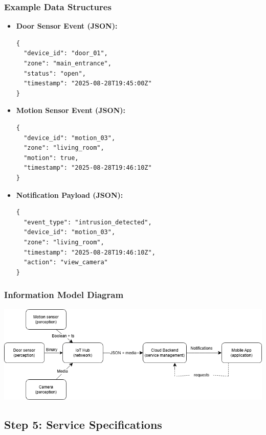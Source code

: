 \documentclass[conference]{IEEEtran}
\begin{document}
\subsubsection{Example Data Structures}
\begin{itemize}
    \item \textbf{Door Sensor Event (JSON):}
\begin{verbatim}
{
  "device_id": "door_01",
  "zone": "main_entrance",
  "status": "open",
  "timestamp": "2025-08-28T19:45:00Z"
}
\end{verbatim}

    \item \textbf{Motion Sensor Event (JSON):}
\begin{verbatim}
{
  "device_id": "motion_03",
  "zone": "living_room",
  "motion": true,
  "timestamp": "2025-08-28T19:46:10Z"
}
\end{verbatim}

    \item \textbf{Notification Payload (JSON):}
\begin{verbatim}
{
  "event_type": "intrusion_detected",
  "device_id": "motion_03",
  "zone": "living_room",
  "timestamp": "2025-08-28T19:46:10Z",
  "action": "view_camera"
}
\end{verbatim}
\end{itemize}


\subsubsection{Information Model Diagram}

\begin{center}
\includegraphics[width=\columnwidth]{information_model.png}
\label{fig:information-model}
\end{center}
\subsection{Step 5: Service Specifications}
\end{document}
